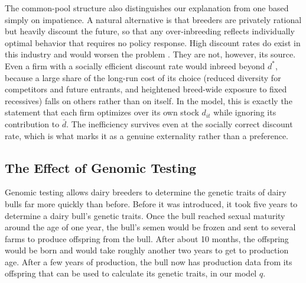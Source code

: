 \documentclass[12pt,letterpaper]{article}
\begin{document}
The common-pool structure also distinguishes our explanation from one based simply on impatience. A natural alternative is that breeders are privately rational but heavily discount the future, so that any over-inbreeding reflects individually optimal behavior that requires no policy response. High discount rates do exist in this industry and would worsen the problem \citep{Wuepper2023}. They are not, however, its source. Even a firm with a socially efficient discount rate would inbreed beyond $d^{*}$, because a large share of the long-run cost of its choice (reduced diversity for competitors and future entrants, and heightened breed-wide exposure to fixed recessives) falls on others rather than on itself. In the model, this is exactly the statement that each firm optimizes over its own stock $d_{it}$ while ignoring its contribution to $\bar{d}$. The inefficiency survives even at the socially correct discount rate, which is what marks it as a genuine externality rather than a preference.

\subsection{The Effect of Genomic Testing\label{subsec:effects_gt}}
Genomic testing allows dairy breeders to determine the genetic traits of dairy bulls far more quickly than before.
Before it was introduced, it took five years to determine a dairy bull's genetic traits.
Once the bull reached sexual maturity around the age of one year, the bull's semen would be frozen and sent to several farms to produce offspring from the bull.
After about 10 months, the offspring would be born and would take roughly another two years to get to production age. 
After a few years of production, the bull now has production data from its offspring that can be used to calculate its genetic traits, in our model $q$.
\end{document}

